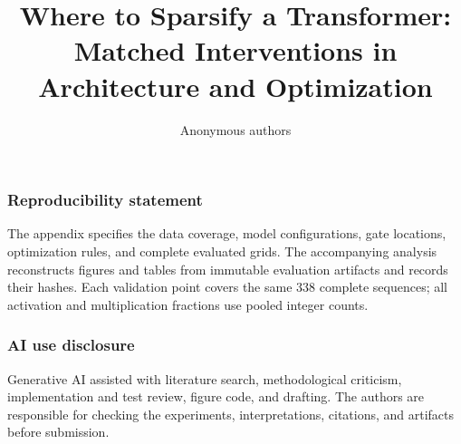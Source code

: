 \documentclass{article}
\title{Where to Sparsify a Transformer:\\
Matched Interventions in Architecture and Optimization}
\author{Anonymous authors}
\begin{document}
\maketitle









\FloatBarrier
\subsubsection*{Reproducibility statement}
The appendix specifies the data coverage, model configurations, gate locations,
optimization rules, and complete evaluated grids. The accompanying analysis
reconstructs figures and tables from immutable evaluation artifacts and records
their hashes. Each validation point covers the same 338 complete sequences;
all activation and multiplication fractions use pooled integer counts.
\subsubsection*{AI use disclosure}
Generative AI assisted with literature search, methodological criticism,
implementation and test review, figure code, and drafting. The authors are
responsible for checking the experiments, interpretations, citations, and
artifacts before submission.


\clearpage
\appendix

\end{document}
